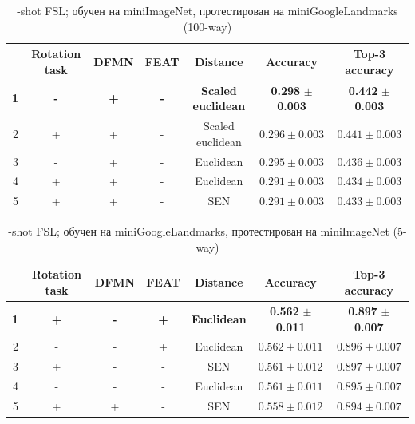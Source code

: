 \documentclass[a4paper, 12pt]{report}
\begin{document}
 \begin{table}[H]
\begin{adjustbox}{center}
\begin{tabular}{| r | c c c c | c |  c | }
\hline
    & Rotation task   & DFMN   & FEAT   & Distance         & Accuracy         & Top-3 accuracy   \\
    \hline
  \textbf{1} & \textbf{-} & \textbf{+} & \textbf{-} & \textbf{Scaled} \textbf{euclidean} & \textbf{0.298} $\pm$ \textbf{0.003} & \textbf{0.442} $\pm$ \textbf{0.003} \\
    \hline
  2 & +               & +      & -      & Scaled euclidean & $0.296 \pm 0.003$ & $0.441 \pm 0.003$ \\
    \hline
  3 & -               & +      & -      & Euclidean        & $0.295 \pm 0.003$ & $0.436 \pm 0.003$ \\
    \hline
  4 & +               & +      & -      & Euclidean        & $0.291 \pm 0.003$ & $0.434 \pm 0.003$ \\
    \hline
  5 & +               & +      & -      & SEN              & $0.291 \pm 0.003$ & $0.433 \pm 0.003$ \\
\hline
\end{tabular}
\end{adjustbox}
\caption{-shot FSL; обучен на miniImageNet, протестирован на miniGoogleLandmarks (100-way)}
\end{table}

\begin{table}[H]
\begin{adjustbox}{center}
\begin{tabular}{| r | c c c c | c |  c | }
\hline
    & Rotation task   & DFMN   & FEAT   & Distance         & Accuracy         & Top-3 accuracy   \\
    \hline
  \textbf{1} & \textbf{+} & \textbf{-} & \textbf{+} & \textbf{Euclidean} & \textbf{0.562} $\pm$ \textbf{0.011} & \textbf{0.897} $\pm$ \textbf{0.007} \\
    \hline
  2 & -               & -      & +      & Euclidean        & $0.562 \pm 0.011$ & $0.896 \pm 0.007$ \\
    \hline
  3 & +               & -      & -      & SEN              & $0.561 \pm 0.012$ & $0.897 \pm 0.007$ \\
    \hline
  4 & -               & -      & -      & Euclidean        & $0.561 \pm 0.011$ & $0.895 \pm 0.007$ \\
    \hline
  5 & +               & +      & -      & SEN              & $0.558 \pm 0.012$ & $0.894 \pm 0.007$ \\
\hline
\end{tabular}
\end{adjustbox}
\caption{-shot FSL; обучен на miniGoogleLandmarks, протестирован на miniImageNet (5-way)}
\end{table}
\end{document}
